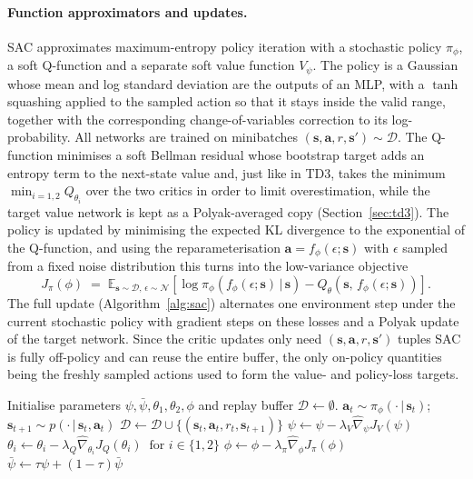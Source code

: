 \documentclass{article}
\begin{document}
\paragraph{Function approximators and updates.}
SAC approximates maximum-entropy policy iteration \citep{haarnoja2018soft} with a stochastic policy $\pi_\phi$, a soft Q-function and a separate soft value function $V_\psi$. The policy is a Gaussian whose mean and log standard deviation are the outputs of an MLP, with a $\tanh$ squashing applied to the sampled action so that it stays inside the valid range, together with the corresponding change-of-variables correction to its log-probability. All networks are trained on minibatches $(\mathbf{s},\mathbf{a},r,\mathbf{s}')\sim\mathcal{D}$. The Q-function minimises a soft Bellman residual whose bootstrap target adds an entropy term to the next-state value and, just like in TD3, takes the minimum $\min_{i=1,2} Q_{\theta_i}$ over the two critics in order to limit overestimation, while the target value network is kept as a Polyak-averaged copy (Section~\ref{sec:td3}). The policy is updated by minimising the expected KL divergence to the exponential of the Q-function, and using the reparameterisation $\mathbf{a} = f_\phi(\epsilon;\mathbf{s})$ with $\epsilon$ sampled from a fixed noise distribution this turns into the low-variance objective
\begin{equation}
    J_\pi(\phi) \;=\; \mathbb{E}_{\mathbf{s}\sim\mathcal{D},\,\epsilon\sim\mathcal{N}}
    \!\left[\log \pi_\phi\!\left(f_\phi(\epsilon;\mathbf{s})\,|\,\mathbf{s}\right) -
        Q_\theta\!\left(\mathbf{s},\,f_\phi(\epsilon;\mathbf{s})\right)\right].
    \label{eq:sac-pi-loss}
\end{equation}
The full update (Algorithm~\ref{alg:sac}) alternates one environment step under the current stochastic policy with gradient steps on these losses and a Polyak update of the target network. Since the critic updates only need $(\mathbf{s},\mathbf{a},r,\mathbf{s}')$ tuples SAC is fully off-policy and can reuse the entire buffer, the only on-policy quantities being the freshly sampled actions used to form the value- and policy-loss targets.

\begin{algorithm}[t]
\caption{Soft Actor-Critic \citep{haarnoja2018soft}}
\label{alg:sac}
\begin{algorithmic}
\State Initialise parameters $\psi, \bar\psi, \theta_1, \theta_2, \phi$ and replay buffer $\mathcal{D} \gets \emptyset$.
        \State $\mathbf{a}_t \sim \pi_\phi(\cdot\,|\,\mathbf{s}_t)$;\;
               $\mathbf{s}_{t+1} \sim p(\cdot\,|\,\mathbf{s}_t,\mathbf{a}_t)$
        \State $\mathcal{D} \gets \mathcal{D} \cup \{(\mathbf{s}_t,\mathbf{a}_t,r_t,\mathbf{s}_{t+1})\}$
    \EndFor
        \State $\psi \gets \psi - \lambda_V \hat\nabla_\psi J_V(\psi)$
        \State $\theta_i \gets \theta_i - \lambda_Q \hat\nabla_{\theta_i} J_Q(\theta_i)\;\;\text{for } i \in \{1,2\}$
        \State $\phi \gets \phi - \lambda_\pi \hat\nabla_\phi J_\pi(\phi)$
        \State $\bar\psi \gets \tau \psi + (1-\tau)\bar\psi$
    \EndFor
\EndFor
\end{algorithmic}
\end{algorithm}
\end{document}
